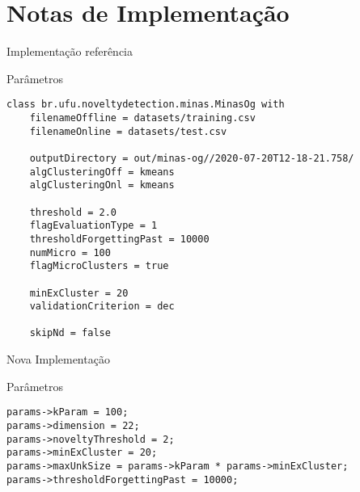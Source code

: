 \documentclass[aspectratio=43,10pt]{beamer}
\begin{document}

\section{Notas de Implementação}

\begin{frame}[fragile]{Implementação referência}
  \begin{alertblock}{Parâmetros}
    \begin{Verbatim}[fontsize=\footnotesize]
class br.ufu.noveltydetection.minas.MinasOg with
	filenameOffline = datasets/training.csv
	filenameOnline = datasets/test.csv

	outputDirectory = out/minas-og//2020-07-20T12-18-21.758/
	algClusteringOff = kmeans
	algClusteringOnl = kmeans

	threshold = 2.0
	flagEvaluationType = 1
	thresholdForgettingPast = 10000
	numMicro = 100
	flagMicroClusters = true

	minExCluster = 20
	validationCriterion = dec

	skipNd = false
    \end{Verbatim}
  \end{alertblock}
\end{frame}
\begin{frame}[fragile]{Nova Implementação}
  \begin{alertblock}{Parâmetros}
    \begin{Verbatim}[fontsize=\small]
params->kParam = 100;
params->dimension = 22;
params->noveltyThreshold = 2;
params->minExCluster = 20;
params->maxUnkSize = params->kParam * params->minExCluster;
params->thresholdForgettingPast = 10000;
    \end{Verbatim}
  \end{alertblock}
\end{frame}


\end{document}
